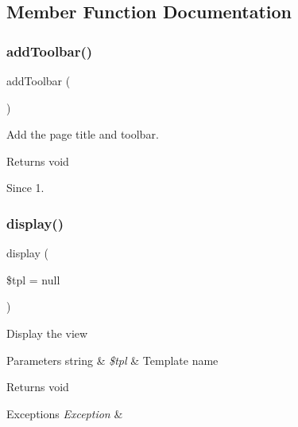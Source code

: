 \subsection{Member Function Documentation}
\mbox{\label{classtks__agenda_view_items_af327e89538be614e923c7e5863319f43}} 
\subsubsection{add\+Toolbar()}
{\footnotesize\ttfamily add\+Toolbar (\begin{DoxyParamCaption}{ }\end{DoxyParamCaption})\hspace{0.3cm}{\ttfamily [protected]}}

Add the page title and toolbar.

\begin{DoxyReturn}{Returns}
void
\end{DoxyReturn}
\begin{DoxySince}{Since}
1. 
\end{DoxySince}
\mbox{\label{classtks__agenda_view_items_aa988850da0dbeb9875debea0280754d5}} 
\subsubsection{display()}
{\footnotesize\ttfamily display (\begin{DoxyParamCaption}\item[{}]{\$tpl = {\ttfamily null} }\end{DoxyParamCaption})}

Display the view


\begin{DoxyParams}[1]{Parameters}
string & {\em \$tpl} & Template name\\
\hline
\end{DoxyParams}
\begin{DoxyReturn}{Returns}
void
\end{DoxyReturn}

\begin{DoxyExceptions}{Exceptions}
{\em Exception} & \\
\hline
\end{DoxyExceptions}
\mbox{\label{classtks__agenda_view_items_a827c9db3721004f92a717644f5f48caf}} 
